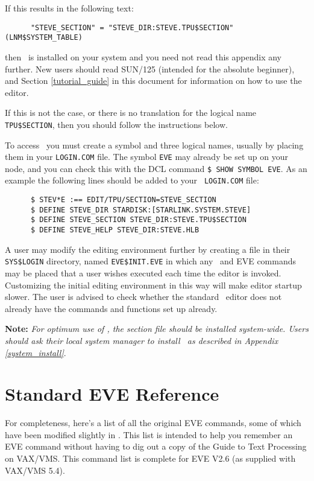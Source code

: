 If this results in the following text:

\begin{verbatim}
      "STEVE_SECTION" = "STEVE_DIR:STEVE.TPU$SECTION" (LNM$SYSTEM_TABLE)
\end{verbatim}

then \STEve\ is installed on your system and you need not read this appendix
any further. New users should read SUN/125 (intended for the absolute
beginner), and Section \ref{tutorial_guide} in this document for information on
how to use the editor.

If this is not the case, or there is no translation for the logical name
{\tt TPU\$SECTION}, then you should follow the instructions below.

To access \STEve\ you must create a symbol and three logical names, usually by
placing them in your {\tt LOGIN.COM} file. The symbol {\tt EVE} may already be
set up on your node, and you can check this with the DCL command  {\tt \$ SHOW
SYMBOL EVE}. As an example the following  lines should be added to your {\tt
LOGIN.COM} file:

\begin{verbatim}
      $ STEV*E :== EDIT/TPU/SECTION=STEVE_SECTION
      $ DEFINE STEVE_DIR STARDISK:[STARLINK.SYSTEM.STEVE]
      $ DEFINE STEVE_SECTION STEVE_DIR:STEVE.TPU$SECTION
      $ DEFINE STEVE_HELP STEVE_DIR:STEVE.HLB
\end{verbatim}

A user may modify the editing environment further by creating a file in their
{\tt SYS\$LOGIN} directory, named {\tt EVE\$INIT.EVE} in which any \STEve\ and
EVE commands may be placed that a user wishes executed each time the editor is
invoked. Customizing the initial editing environment in this way will make
editor startup slower. The user is advised to check whether the standard
\STEve\ editor does not already have the commands and functions set up already.

{\bf Note:} {\em For optimum use of \STEve, the section file should be
installed system-wide. Users should ask their local system manager to install
\STEve\ as described in Appendix \ref{system_install}}.

\newpage
\section{Standard EVE Reference}
\label{deceve}
For completeness, here's a list of all the original EVE commands, some of which
have been modified slightly in \STEve.  This list is intended to help you
remember an EVE command without having to dig out a copy of the Guide to Text
Processing on VAX/VMS. This command list is complete for EVE V2.6 (as supplied
with VAX/VMS 5.4).

